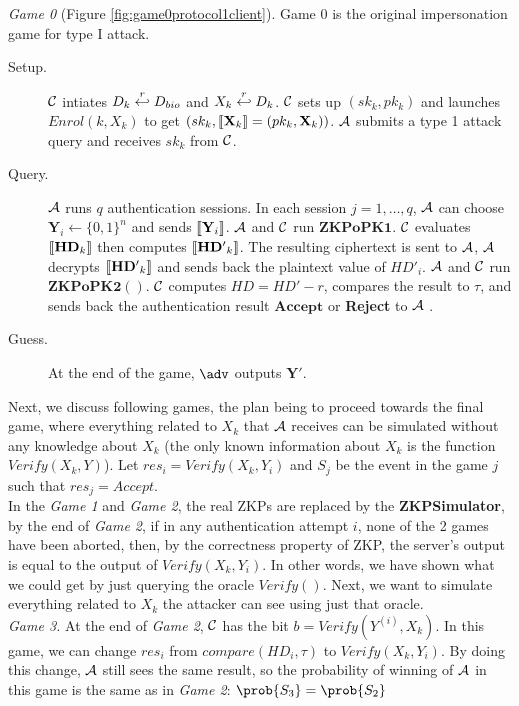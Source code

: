 \textit{Game 0} (Figure \ref{fig:game0protocol1client}). Game 0 is the original
impersonation game for type I attack.
\begin{description}
\item [Setup.] $\mathcal{C}$ intiates $D_k \stackrel{r}{\hookleftarrow} D_{bio}$ and
  $X_k \stackrel{r}{\hookleftarrow} D_k$. $\mathcal{C}$ sets up $(sk_k, pk_k)$ and launches
  $Enrol(k, X_k)$ to get $(sk_k, \left\llbracket\mathbf{X}_{k}\right\rrbracket =(pk_k, \mathbf{X}_{k}))$.
  $\mathcal{A}$ submits a type 1 attack query and receives $sk_k$ from
  $\mathcal{C}$.
\item [Query.] $\mathcal{A}$ runs $q$ authentication sessions. In each session
  $j = 1, \dots, q$, $\mathcal{A}$ can choose $\mathbf{Y}_{i} \gets \{0,1\}^{n}$
  and sends $\left\llbracket\mathbf{Y}_{i}\right\rrbracket$. $\mathcal{A}$ and $\mathcal{C}$ run
  $\mathbf{ZKPoPK1}$. $\mathcal{C}$ evaluates $\left\llbracket\mathbf{HD}_{k}\right\rrbracket$ then
  computes $\left\llbracket\mathbf{HD'}_{k}\right\rrbracket$. The resulting ciphertext is sent to
  $\mathcal{A}$, $\mathcal{A}$ decrypts $\left\llbracket\mathbf{HD'}_{k}\right\rrbracket$ and sends back the
  plaintext value of $HD'_{i}$. $\mathcal{A}$ and $\mathcal{C}$ run
  $\mathbf{ZKPoPK2}()$. $\mathcal{C}$ computes $HD = HD' - r$, compares the result to $\tau$, and sends back the authentication result $\mathbf{Accept}$ or \textbf{Reject} to $\mathcal{A}$ .
\item [Guess.] At the end of the game, $\adv$ outputs $\mathbf{Y'}$.
\end{description}

Next, we discuss following games, the plan being to proceed towards the final
game, where everything related to $X_k$ that $\mathcal{A}$ receives can be simulated
without any knowledge about $X_k$ (the only known information about $X_k$ is the
function $Verify(X_k, Y)$). Let $res_i = Verify(X_k, Y_{i})$ and $S_j$ be
the event in the game $j$ such that $res_j = Accept$.\\

In the \textit{Game 1} and \textit{Game 2}, the real ZKPs are replaced by the
\textbf{ZKPSimulator}, by the end of \textit{Game 2}, if in any authentication
attempt $i$, none of the 2 games have been aborted, then, by the correctness
property of ZKP, the server's output is equal to the output of
$Verify(X_k, Y_{i})$. In other words, we have shown what we could get by just
querying the oracle $Verify()$. Next, we want to simulate everything related to
$X_k$ the attacker
can see using just that oracle.\\

\textit{Game 3.} At the end of \textit{Game 2}, $\mathcal{C}$ has the bit
$b = Verify(Y^{(i)},X_k)$. In this game, we can change $res_{i}$ from
$compare(HD_{i},\tau)$ to $Verify(X_{k},Y_{i})$. By doing this change,
$\mathcal{A}$ still sees the same result, so the probability of winning of
$\mathcal{A}$ in this game is the same as in \textit{Game 2}: $\prob{S_{3}} = \prob{S_{2}}$
\\

